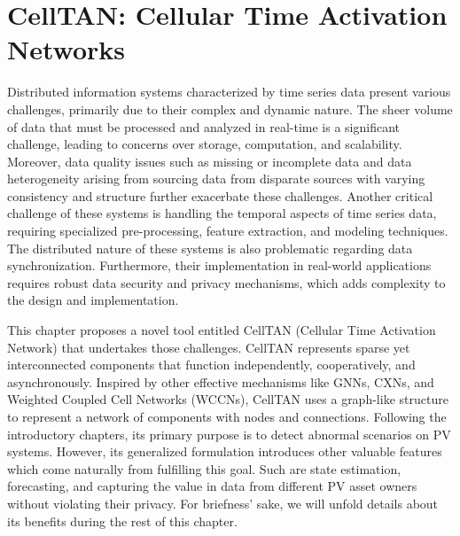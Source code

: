 \chapter{CellTAN: Cellular Time Activation Networks} \label{chap:chap4}

Distributed information systems characterized by time series data present various challenges, primarily due to their complex and dynamic nature. The sheer volume of data that must be processed and analyzed in real-time is a significant challenge, leading to concerns over storage, computation, and scalability. Moreover, data quality issues such as missing or incomplete data and data heterogeneity arising from sourcing data from disparate sources with varying consistency and structure further exacerbate these challenges. Another critical challenge of these systems is handling the temporal aspects of time series data, requiring specialized pre-processing, feature extraction, and modeling techniques. The distributed nature of these systems is also problematic regarding data synchronization. Furthermore, their implementation in real-world applications requires robust data security and privacy mechanisms, which adds complexity to the design and implementation.

This chapter proposes a novel tool entitled CellTAN (Cellular Time Activation Network) that undertakes those challenges. CellTAN represents sparse yet interconnected components that function independently, cooperatively, and asynchronously. Inspired by other effective mechanisms like GNNs, CXNs, and Weighted Coupled Cell Networks (WCCNs), CellTAN uses a graph-like structure to represent a network of components with nodes and connections. Following the introductory chapters, its primary purpose is to detect abnormal scenarios on PV systems. However, its generalized formulation introduces other valuable features which come naturally from fulfilling this goal. Such are state estimation, forecasting, and capturing the value in data from different PV asset owners without violating their privacy. For briefness' sake, we will unfold details about its benefits during the rest of this chapter.

